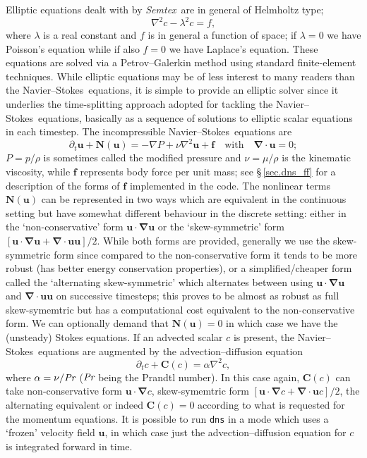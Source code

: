 \documentclass[11pt]{report}
\def\Pr{\mbox{\it Pr}}                              %
\newcommand{\Semtex}{\emph{Semtex}} \newcommand{\Dog}{\emph{Dog}}
\newcommand\NavSto{Navier--Stokes}
\begin{document}
Elliptic equations dealt with by \Semtex\ are in general of Helmholtz
type;
\begin{equation}
  \nabla^2 c - \lambda^2 c = f,
  \label{eq.elliptic}
\end{equation}
where $\lambda$ is a real constant and $f$ is in general a function of
space; if $\lambda=0$ we have Poisson's equation while if also $f=0$
we have Laplace's equation.  These equations are solved via a
Petrov--Galerkin method using standard finite-element techniques.
While elliptic equations may be of less interest to many readers than
the \NavSto\ equations, it is simple to provide an elliptic solver
since it underlies the time-splitting approach adopted for tackling
the \NavSto\ equations, \ie basically as a sequence of solutions to
elliptic scalar equations in each timestep.
%
The incompressible \NavSto\ equations are
\begin{equation}
\partial_t\bm{u}+\bm{N}(\bm{u}) = -\nabla P + \nu\nabla^2\bm{u} + \bm{f}
\quad\text{with}\quad
\bm{\nabla\cdot u} = 0;
\label{eq.navsto}
\end{equation}
$P=p/\rho$ is sometimes called the modified pressure and
$\nu=\mu/\rho$ is the kinematic viscosity, while $\bm{f}$ represents
body force per unit mass; see \S\,\ref{sec.dns_ff} for a description
of the forms of $\bm{f}$ implemented in the code.  The nonlinear terms
$\bm{N}(\bm{u})$ can be represented in two ways which are equivalent
in the continuous setting but have somewhat different behaviour in the
discrete setting: either in the `non-conservative' form
$\bm{u\cdot\nabla u}$ or the `skew-symmetric' form $[\bm{u\cdot\nabla
    u} + \bm{\nabla\cdot uu}]/2$.
%
While both forms are provided, generally we use the skew-symmetric
form since compared to the non-conservative form it tends to be more
robust (has better energy conservation properties), or a
simplified/cheaper form called the `alternating skew-symmetric' which
alternates between using $\bm{u\cdot\nabla u}$ and $\bm{\nabla\cdot
  uu}$ on successive timesteps; this proves to be almost as robust as
full skew-symemtric but has a computational cost equivalent to the
non-conservative form.  We can optionally demand that $\bm{N}(\bm{u})
= 0$ in which case we have the (unsteady) Stokes equations.
%
If an advected scalar $c$ is present, the \NavSto\ equations are
augmented by the advection--diffusion equation
\begin{equation}
  \partial_t c + \bm{C}(c) = \alpha\nabla^2 c,
  \label{eq.advectdiff}
\end{equation}
where $\alpha = \nu/\Pr$ ($\Pr$ being the Prandtl number).  In this
case again, $\bm{C}(c)$ can take non-conservative form
$\bm{u\cdot\nabla}c$, skew-symemtric form $[\bm{u\cdot\nabla}c +
  \bm{\nabla\cdot u}c]/2$, the alternating equivalent or indeed
$\bm{C}(c)=0$ according to what is requested for the momentum
equations.  It is possible to run \verb|dns| in a mode which uses a
`frozen' velocity field $\bm{u}$, in which case just the
advection--diffusion equation for $c$ is integrated forward in time.
\end{document}
